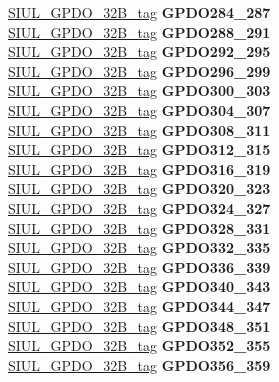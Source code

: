 \begin{DoxyCompactItemize}
\begin{tabbing}
\>\>\mbox{\hyperlink{unionSIUL__GPDO__32B__tag}{SIUL\_GPDO\_32B\_tag}} {\bfseries GPDO284\_287}\\
\>\>\mbox{\hyperlink{unionSIUL__GPDO__32B__tag}{SIUL\_GPDO\_32B\_tag}} {\bfseries GPDO288\_291}\\
\>\>\mbox{\hyperlink{unionSIUL__GPDO__32B__tag}{SIUL\_GPDO\_32B\_tag}} {\bfseries GPDO292\_295}\\
\>\>\mbox{\hyperlink{unionSIUL__GPDO__32B__tag}{SIUL\_GPDO\_32B\_tag}} {\bfseries GPDO296\_299}\\
\>\>\mbox{\hyperlink{unionSIUL__GPDO__32B__tag}{SIUL\_GPDO\_32B\_tag}} {\bfseries GPDO300\_303}\\
\>\>\mbox{\hyperlink{unionSIUL__GPDO__32B__tag}{SIUL\_GPDO\_32B\_tag}} {\bfseries GPDO304\_307}\\
\>\>\mbox{\hyperlink{unionSIUL__GPDO__32B__tag}{SIUL\_GPDO\_32B\_tag}} {\bfseries GPDO308\_311}\\
\>\>\mbox{\hyperlink{unionSIUL__GPDO__32B__tag}{SIUL\_GPDO\_32B\_tag}} {\bfseries GPDO312\_315}\\
\>\>\mbox{\hyperlink{unionSIUL__GPDO__32B__tag}{SIUL\_GPDO\_32B\_tag}} {\bfseries GPDO316\_319}\\
\>\>\mbox{\hyperlink{unionSIUL__GPDO__32B__tag}{SIUL\_GPDO\_32B\_tag}} {\bfseries GPDO320\_323}\\
\>\>\mbox{\hyperlink{unionSIUL__GPDO__32B__tag}{SIUL\_GPDO\_32B\_tag}} {\bfseries GPDO324\_327}\\
\>\>\mbox{\hyperlink{unionSIUL__GPDO__32B__tag}{SIUL\_GPDO\_32B\_tag}} {\bfseries GPDO328\_331}\\
\>\>\mbox{\hyperlink{unionSIUL__GPDO__32B__tag}{SIUL\_GPDO\_32B\_tag}} {\bfseries GPDO332\_335}\\
\>\>\mbox{\hyperlink{unionSIUL__GPDO__32B__tag}{SIUL\_GPDO\_32B\_tag}} {\bfseries GPDO336\_339}\\
\>\>\mbox{\hyperlink{unionSIUL__GPDO__32B__tag}{SIUL\_GPDO\_32B\_tag}} {\bfseries GPDO340\_343}\\
\>\>\mbox{\hyperlink{unionSIUL__GPDO__32B__tag}{SIUL\_GPDO\_32B\_tag}} {\bfseries GPDO344\_347}\\
\>\>\mbox{\hyperlink{unionSIUL__GPDO__32B__tag}{SIUL\_GPDO\_32B\_tag}} {\bfseries GPDO348\_351}\\
\>\>\mbox{\hyperlink{unionSIUL__GPDO__32B__tag}{SIUL\_GPDO\_32B\_tag}} {\bfseries GPDO352\_355}\\
\>\>\mbox{\hyperlink{unionSIUL__GPDO__32B__tag}{SIUL\_GPDO\_32B\_tag}} {\bfseries GPDO356\_359}\\

\end{tabbing}
\end{DoxyCompactItemize}
